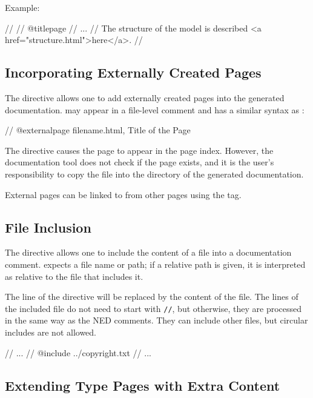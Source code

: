 Example:
\begin{ned}
//
// @titlepage
// ...
// The structure of the model is described <a href="structure.html">here</a>.
//
\end{ned}


\subsection{Incorporating Externally Created Pages}
\label{sec:neddoc:externally-created-pages}

The  directive allows one to add externally created
pages into the generated documentation.  may appear
in a file-level comment and has a similar syntax as :

\begin{ned}
// @externalpage filename.html, Title of the Page
\end{ned}

The directive causes the page to appear in the page index. However, the
documentation tool does not check if the page exists, and it is the user's
responsibility to copy the file into the directory of the generated
documentation.

External pages can be linked to from other pages using the  tag.


\subsection{File Inclusion}
\label{sec:neddoc:file-inclusion}

The  directive allows one to include the content of a file
into a documentation comment.  expects a file name or path; if
a relative path is given, it is interpreted as relative to the file that
includes it.

The line of the  directive will be replaced by the
content of the file. The lines of the included file do not need
to start with \texttt{//}, but otherwise, they are processed in the same way
as the NED comments. They can include other files, but circular
includes are not allowed.

\begin{ned}
// ...
// @include ../copyright.txt
// ...
\end{ned}

\subsection{Extending Type Pages with Extra Content}
\label{sec:neddoc:extending-type-pages}

